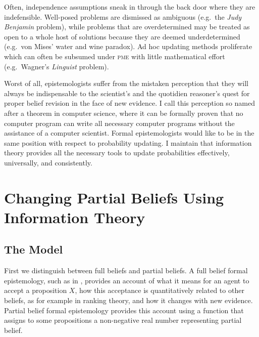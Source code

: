 \documentclass[phd,12pt,oneside]{ubcthesis}
\begin{document}
Often, independence assumptions sneak in through the back door where
they are indefensible. Well-posed problems are dismissed as ambiguous
(e.g.\ the \emph{Judy Benjamin} problem), while problems that are
overdetermined may be treated as open to a whole host of solutions
because they are deemed underdetermined (e.g.\ von Mises' water and
wine paradox). Ad hoc updating methods proliferate which can often be
subsumed under \textsc{pme} with little mathematical effort (e.g.\
Wagner's \emph{Linguist} problem).

Worst of all, epistemologists suffer from the mistaken perception that
they will always be indispensable to the scientist's and the quotidien
reasoner's quest for proper belief revision in the face of new
evidence. I call this perception  so named
after a theorem in computer science, where it can be formally proven
that no computer program can write all necessary computer programs
without the assistance of a computer scientist. Formal epistemologists
would like to be in the same position with respect to probability
updating. I maintain that information theory provides all the
necessary tools to update probabilities effectively, universally, and
consistently.

\chapter{Changing Partial Beliefs Using Information Theory}
\label{chp:oohoodee}

\section{The Model}
\label{sec:ipepheez}

First we distinguish between full beliefs and partial beliefs. A full
belief formal epistemology, such as in \scite{7}{spohn12}{}, provides
an account of what it means for an agent to accept a proposition
$X$, how this acceptance is quantitatively related to other beliefs,
as for example in ranking theory, and how it changes with new
evidence. Partial belief formal epistemology provides this account
using a function that assigns to some propositions a non-negative real
number representing partial belief. 
\end{document}
